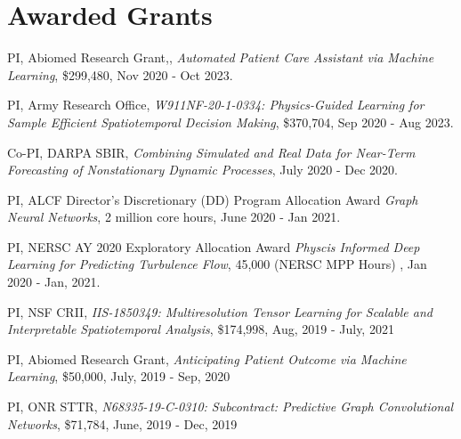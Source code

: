 \documentclass[margin,line]{res}
\begin{document}
\begin{resume}
\begin{enumerate}[label={[W\arabic*]}]
%
%
%
\end{enumerate}


\section{\sc Awarded Grants}
\begin{enumerate}[label={[G\arabic*]}]
\item PI, {Abiomed Research Grant},, \textit{Automated Patient Care Assistant via Machine Learning}, \$299,480, Nov 2020 - Oct 2023.
\item PI,   Army Research Office,  \textit{W911NF-20-1-0334: Physics-Guided Learning for Sample Efficient Spatiotemporal Decision Making}, \$370,704, Sep 2020 - Aug 2023. 
\item Co-PI, DARPA SBIR, \textit{Combining Simulated and Real Data
for Near-Term Forecasting of Nonstationary Dynamic Processes}, July 2020 - Dec 2020.
\item PI,  ALCF Director’s Discretionary (DD) Program Allocation Award \textit{Graph Neural Networks},  2 million core hours, June 2020 - Jan 2021.
\item PI,  NERSC AY 2020 Exploratory Allocation Award \textit{Physcis Informed Deep Learning for Predicting Turbulence Flow}, 45,000  (NERSC MPP Hours) , Jan 2020 - Jan, 2021.
\item  PI, {NSF CRII},    \textit{IIS-1850349: Multiresolution Tensor Learning for Scalable and Interpretable Spatiotemporal Analysis},    \$174,998,  Aug, 2019 - July, 2021

\item PI, {Abiomed Research Grant},    \textit{Anticipating Patient Outcome via Machine Learning}, \$50,000, July, 2019 - Sep, 2020

\item PI,  {ONR STTR}, \textit{N68335-19-C-0310: Subcontract: Predictive Graph Convolutional Networks},  \$71,784, June, 2019 - Dec, 2019



\end{enumerate}
\end{resume}
\end{document}
